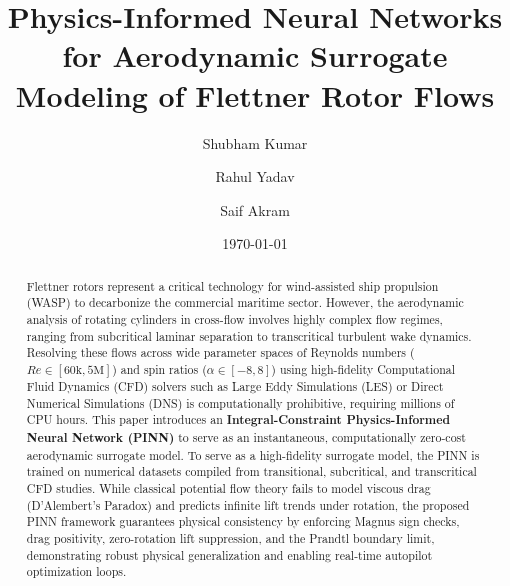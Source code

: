 \documentclass[aip,pof,reprint,onecolumn,amsmath,amssymb,graphicx,longbibliography]{revtex4-2}
\begin{document}
\title{Physics-Informed Neural Networks for Aerodynamic Surrogate Modeling of Flettner Rotor Flows}

\author{Shubham Kumar}

\author{Rahul Yadav}

\author{Saif Akram}

\date{\today}

\begin{abstract}
Flettner rotors represent a critical technology for wind-assisted ship propulsion (WASP) to decarbonize the commercial maritime sector. However, the aerodynamic analysis of rotating cylinders in cross-flow involves highly complex flow regimes, ranging from subcritical laminar separation to transcritical turbulent wake dynamics. Resolving these flows across wide parameter spaces of Reynolds numbers ($Re \in [60\text{k}, 5\text{M}]$) and spin ratios ($\alpha \in [-8, 8]$) using high-fidelity Computational Fluid Dynamics (CFD) solvers such as Large Eddy Simulations (LES) or Direct Numerical Simulations (DNS) is computationally prohibitive, requiring millions of CPU hours. This paper introduces an \textbf{Integral-Constraint Physics-Informed Neural Network (PINN)} to serve as an instantaneous, computationally zero-cost aerodynamic surrogate model. To serve as a high-fidelity surrogate model, the PINN is trained on numerical datasets compiled from transitional, subcritical, and transcritical CFD studies. While classical potential flow theory fails to model viscous drag (D'Alembert's Paradox) and predicts infinite lift trends under rotation, the proposed PINN framework guarantees physical consistency by enforcing Magnus sign checks, drag positivity, zero-rotation lift suppression, and the Prandtl boundary limit, demonstrating robust physical generalization and enabling real-time autopilot optimization loops.
\end{abstract}

\maketitle
\end{document}
